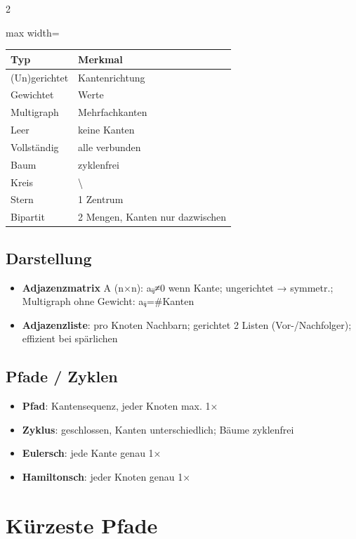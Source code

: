 \documentclass[10pt, a4paper]{article}
\begin{document}
\begin{multicols}{2}
{\small
\begin{adjustbox}{max width=\linewidth}
{\scriptsize
\begin{tabular}{ll}
\toprule
\textbf{Typ} & \textbf{Merkmal} \\
\midrule
(Un)gerichtet & Kantenrichtung \\
Gewichtet & Werte \\
Multigraph & Mehrfachkanten \\
Leer & keine Kanten \\
Vollständig & alle verbunden \\
Baum & zyklenfrei \\
Kreis & \textbackslash{} \\
Stern & 1 Zentrum \\
Bipartit & 2 Mengen, Kanten nur dazwischen \\
\bottomrule
\end{tabular}
}
\end{adjustbox}
}



\subsection{Darstellung}
\begin{itemize}
  \item \textbf{Adjazenzmatrix} A (n×n): aᵢⱼ≠0 wenn Kante; ungerichtet → symmetr.; Multigraph ohne Gewicht: aᵢⱼ=\#Kanten
  \item \textbf{Adjazenzliste}: pro Knoten Nachbarn; gerichtet 2 Listen (Vor-/Nachfolger); effizient bei spärlichen
\end{itemize}


\subsection{Pfade / Zyklen}
\begin{itemize}
  \item \textbf{Pfad}: Kantensequenz, jeder Knoten max. 1×
  \item \textbf{Zyklus}: geschlossen, Kanten unterschiedlich; Bäume zyklenfrei
  \item \textbf{Eulersch}: jede Kante genau 1×
  \item \textbf{Hamiltonsch}: jeder Knoten genau 1×
\end{itemize}


\section{Kürzeste Pfade}


\end{multicols}
\end{document}
